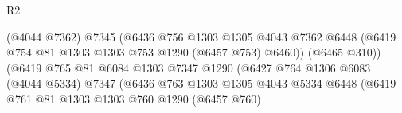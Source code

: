 \begin{lexlean}{R2}
\begin{coremodule}
                                              (@4044 @7362)
                                              @7345
                                              (@6436
                                                @756
                                                @1303
                                                @1305
                                                @4043
                                                @7362
                                                @6448
                                                (@6419
                                                  @754
                                                  @81
                                                  @1303
                                                  @1303
                                                  @753
                                                  @1290
                                                  (@6457 @753)
                                                  @6460))
                                              (@6465 @310))
                                            (@6419
                                              @765
                                              @81
                                              @6084
                                              @1303
                                              @7347
                                              @1290
                                              (@6427
                                                @764
                                                @1306
                                                @6083
                                                (@4044 @5334)
                                                @7347
                                                (@6436
                                                  @763
                                                  @1303
                                                  @1305
                                                  @4043
                                                  @5334
                                                  @6448
                                                  (@6419
                                                    @761
                                                    @81
                                                    @1303
                                                    @1303
                                                    @760
                                                    @1290
                                                    (@6457 @760)

\end{coremodule}
\end{lexlean}
